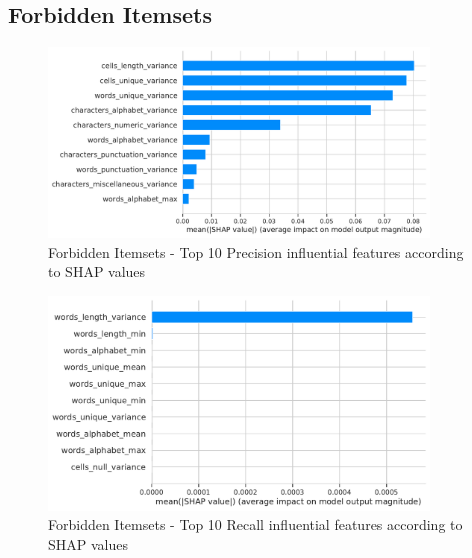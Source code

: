 \subsection{Forbidden Itemsets}
\begin{figure}[H]
    \centering
    \includegraphics[width=0.9\textwidth]{thesis/Figures/RQ4/Shap_cell_prec_ForbiddenItemsets.pdf}
    \caption{Forbidden Itemsets - Top 10 Precision influential features according to SHAP values}
    \label{fig:feature_importance_prec_ForbiddenItemsets}
\end{figure}
\begin{figure}[H]
    \centering
    \includegraphics[width=0.9\textwidth]{thesis/Figures/RQ4/Shap_cell_rec_ForbiddenItemsets.pdf}
    \caption{Forbidden Itemsets - Top 10 Recall influential features according to SHAP values}
    \label{fig:feature_importance_rec_ForbiddenItemsets}
\end{figure}


